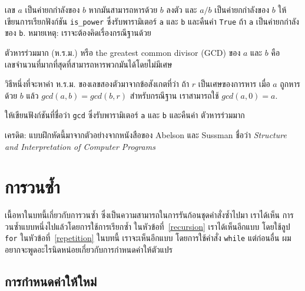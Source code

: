 \begin{exercise}

เลข $a$ เป็นค่ายกกำลังของ $b$ หากมันสามารถหารด้วย $b$ ลงตัว และ $a/b$ เป็นค่ายกกำลังของ $b$
ให้เขียนการเรียกฟังก์ชัน \verb"is_power" ซึ่งรับพารามิเตอร์ {\tt a} และ {\tt b}
และคืนค่า {\tt True} ถ้า {\tt a} เป็นค่ายกกำลังของ {\tt b}. 
หมายเหตุ: เราจะต้องคิดเรื่องกรณีฐานด้วย

\end{exercise}


\begin{exercise}

ตัวหารร่วมมาก (ห.ร.ม.) หรือ the greatest common divisor (GCD) ของ $a$ และ $b$
คือเลขจำนวนที่มากที่สุดที่สามารถหารพวกมันได้โดยไม่มีเศษ 

วิธีหนึ่งที่จะหาค่า ห.ร.ม. ของเลขสองตัวมาจากข้อสังเกตที่ว่า ถ้า $r$ เป็นเศษของการหาร
เมื่อ $a$ ถูกหารด้วย $b$ แล้ว $gcd(a, b) = gcd(b, r)$
สำหรับกรณีฐาน เราสามารถใช้ $gcd(a, 0) = a$.

ให้เขียนฟังก์ชันที่ชื่อว่า \verb"gcd" ซึ่งรับพารามิเตอร์ {\tt a} และ {\tt b} และคืนค่า
ตัวหารร่วมมาก

เครดิต: แบบฝึกหัดนี้มาจากตัวอย่างจากหนังสือของ Abelson และ Sussman ชื่อว่า 
{\em Structure and Interpretation of Computer Programs}

\end{exercise}



\chapter{การวนซ้ำ} %

เนื้อหาในบทนี้เกี่ยวกับการวนซ้ำ ซึ่งเป็นความสามารถในการรันก้อนชุดคำสั่งซ้ำไปมา เราได้เห็น
การวนซ้ำแบบหนึ่งไปแล้วโดยการใช้การเรียกซ้ำ ในหัวข้อที่~\ref{recursion} เราได้เห็นอีกแบบ
โดยใช้ลูป {\tt for} ในหัวข้อที่~\ref{repetition} ในบทนี้ เราจะเห็นอีกแบบ
โดยการใช้คำสั่ง {\tt while}
แต่ก่อนอื่น ผมอยากจะพูดอะไรนิดหน่อยเกี่ยวกับการกำหนดค่าให้ตัวแปร

\section{การกำหนดค่าให้ใหม่ } %

